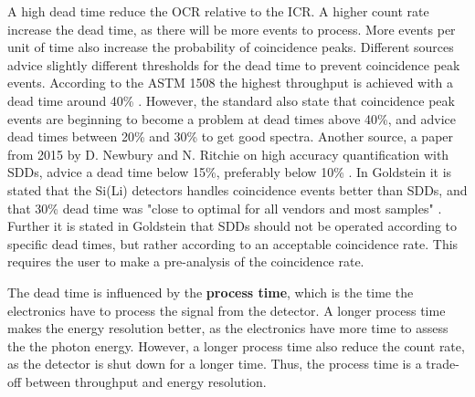 A high dead time reduce the OCR relative to the ICR.
A higher count rate increase the dead time, as there will be more events to process.
More events per unit of time also increase the probability of coincidence peaks.
Different sources advice slightly different thresholds for the dead time to prevent coincidence peak events.
According to the ASTM 1508 the highest throughput is achieved with a dead time around 40\% \cite{astm_e1508_eds_quantification}.
However, the standard also state that coincidence peak events are beginning to become a problem at dead times above 40\%, and advice dead times between 20\% and 30\% to get good spectra.
Another source, a paper from 2015 by D. Newbury and N. Ritchie on high accuracy quantification with SDDs, advice a dead time below 15\%, preferably below 10\% \cite{newbury_deadtime_2014}.
In Goldstein it is stated that the Si(Li) detectors handles coincidence events better than SDDs, and that 30\% dead time was "close to optimal for all vendors and most samples" \cite[p. 466]{goldstein_scanning_2018}.
Further it is stated in Goldstein that SDDs should not be operated according to specific dead times, but rather according to an acceptable coincidence rate.
This requires the user to make a pre-analysis of the coincidence rate.


The dead time is influenced by the \textbf{process time}, which is the time the electronics have to process the signal from the detector.
A longer process time makes the energy resolution better, as the electronics have more time to assess the the photon energy.
However, a longer process time also reduce the count rate, as the detector is shut down for a longer time.
Thus, the process time is a trade-off between throughput and energy resolution.


